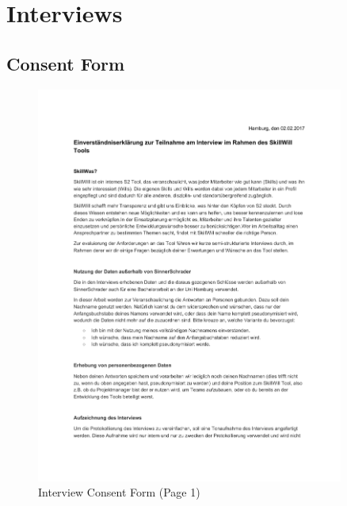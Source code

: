 \cleardoublepage

\appendix
{}

\chapter{Interviews}

\section{Consent Form}
\label{consentform}
\begin{figure}[!h]
    \centering
    \includegraphics[width=0.9\textwidth,page=1]{images/Interview_Consent.pdf}
    \caption[Interview Consent Form]{Interview Consent Form (Page 1)}
\end{figure}
